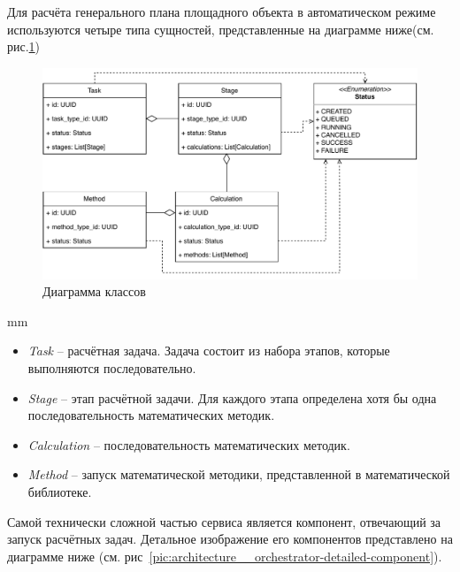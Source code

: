 Для расчёта генерального плана площадного объекта в автоматическом режиме используются четыре типа сущностей,
представленные на диаграмме ниже(см. рис.\ref{pic:architecture__orchestrator-classes})
\begin{figure}[H]
	\hspace*{-2.5 cm}\includegraphics[width=\textwidth]{architecture/pictures/orchestrator/classes}
	\caption{Диаграмма классов}
	\label{pic:architecture__orchestrator-classes}
\end{figure}
 mm

\begin{itemize}
	\item {
		\textit{Task} -- расчётная задача. Задача состоит из набора этапов, которые выполняются последовательно.
	}
	\item {
		\textit{Stage} -- этап расчётной задачи. Для каждого этапа определена хотя бы одна последовательность
		математических методик.
	}
	\item {
		\textit{Calculation} -- последовательность математических методик.
	}
	\item {
		\textit{Method} -- запуск математической методики, представленной в математической библиотеке.
	}
\end{itemize}



Самой технически сложной частью сервиса является компонент, отвечающий за запуск расчётных задач.
Детальное изображение его компонентов представлено
на диаграмме ниже (см. рис\ \ref{pic:architecture__orchestrator-detailed-component}).

